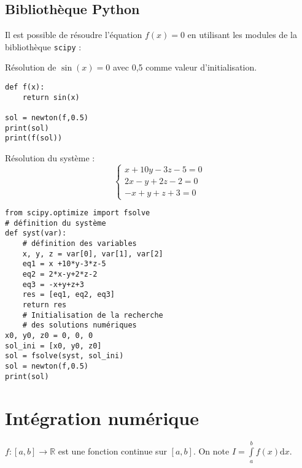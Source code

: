 \subsection{Bibliothèque Python}
Il est possible de résoudre l'équation $f(x)=0$ en utilisant les modules de la bibliothèque \texttt{scipy} :

Résolution de $\sin(x)=0$ avec 0,5 comme valeur d'initialisation.
\begin{lstlisting}
def f(x):
    return sin(x)
   
sol = newton(f,0.5)
print(sol)
print(f(sol))
\end{lstlisting}

Résolution du système : 
$$
\left\{\begin{array}{l} 
x+10y-3z-5 = 0 \\ 
2x-y+2z-2 = 0\\
 -x+y+z+3 = 0\end{array}\right.
 $$


\begin{lstlisting}
from scipy.optimize import fsolve
# définition du système
def syst(var): 
    # définition des variables
    x, y, z = var[0], var[1], var[2] 
    eq1 = x +10*y-3*z-5
    eq2 = 2*x-y+2*z-2
    eq3 = -x+y+z+3
    res = [eq1, eq2, eq3]
    return res
    # Initialisation de la recherche 
    # des solutions numériques
x0, y0, z0 = 0, 0, 0 
sol_ini = [x0, y0, z0]
sol = fsolve(syst, sol_ini)
sol = newton(f,0.5)
print(sol)
\end{lstlisting}




\section{Intégration numérique}

\begin{hypo}  $f:[a,b]\rightarrow \mathbb{R}$ est une fonction continue sur $[a,b]$. On note $I = \int\limits_a^{b} f(x) \mathrm{d}x $.
\end{hypo}

